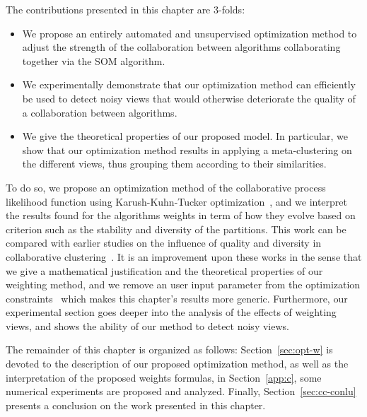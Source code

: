 The contributions presented in this chapter are 3-folds:
\begin{itemize}
	\item We propose an entirely automated and unsupervised optimization method to adjust the strength of the collaboration between algorithms collaborating together via the SOM algorithm.
	\item We experimentally demonstrate that our optimization method can efficiently be used to detect noisy views that would otherwise deteriorate the quality of a collaboration between algorithms.
	\item We give the theoretical properties of our proposed model. In particular, we show that our optimization method results in applying a meta-clustering on the different views, thus grouping them according to their similarities. 
\end{itemize} 
To do so, we propose an optimization method of the collaborative process likelihood function using Karush-Kuhn-Tucker optimization~\cite{KKT1}, and we interpret the results found for the algorithms weights in term of how they evolve based on criterion such as the stability and diversity of the partitions. This work can be compared with earlier studies on the influence of quality and diversity in collaborative clustering~\cite{grozavu2011learning,DBLP:conf/ssci/RastinCGB15,DBLP:conf/ijcnn/GrozavuCB14,Sublime2017}. It is an improvement upon these works in the sense that we give a mathematical justification and the theoretical properties of our weighting method, and we remove an user input parameter from the optimization constraints~\cite{Sublime2017} which makes this chapter's results more generic. Furthermore, our experimental section goes deeper into the analysis of the effects of weighting views, and shows the ability of our method to detect noisy views.


The remainder of this chapter is organized as follows: Section~\ref{sec:opt-w} is devoted to the description of our proposed optimization method, as well as the interpretation of the proposed weights formulas, in Section~\ref{app:c}, some numerical experiments are proposed and analyzed. Finally, Section~\ref{sec:cc-conlu} presents a conclusion on the work presented in this chapter.



